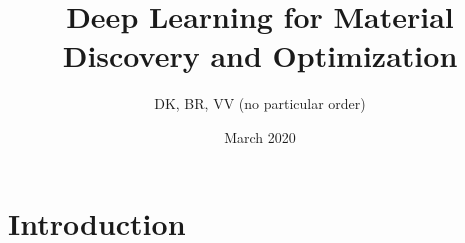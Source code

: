 \documentclass{tufte-book}
\title{Deep Learning for Material Discovery and Optimization}
\author{DK, BR, VV (no particular order)}
\date{March 2020}
\begin{document}
\maketitle

\section{Introduction}









\end{document}
